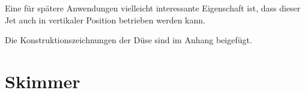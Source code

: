 Eine für spätere Anwendungen vielleicht interessante Eigenschaft ist, dass dieser Jet auch in vertikaler Position betrieben werden kann.

Die Konstruktionszeichnungen der Düse sind im Anhang beigefügt.
%
%



\section{Skimmer} \label{sec:Skimmer}


